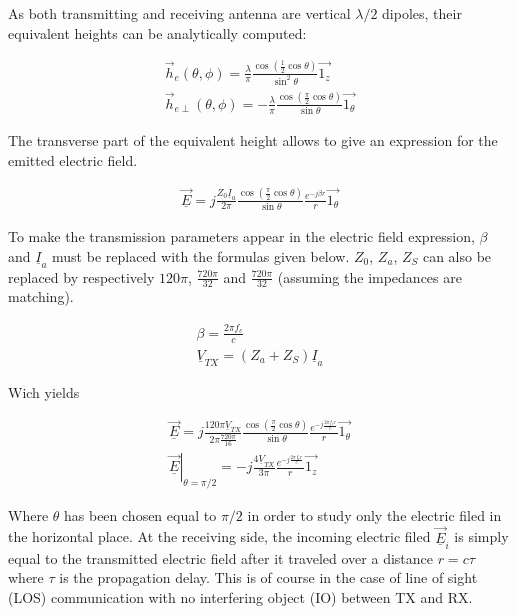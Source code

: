 \documentclass[10pt,a4paper]{ULBreport}
\begin{document}
As both transmitting and receiving antenna are vertical $\lambda/2$ dipoles, their equivalent heights can be analytically computed:

\begin{align*}
    \vec{h}_e (\theta, \phi) = \frac{\lambda}{\pi} \frac{\cos(\frac{1}{2}\cos \theta)}{\sin ^2 \theta}\vec{1_z}\\
    \vec{h}_{e\perp} (\theta, \phi) = -\frac{\lambda}{\pi} \frac{\cos(\frac{\pi}{2}\cos \theta)}{\sin \theta}\vec{1_\theta}
\end{align*}

The transverse part of the equivalent height allows to give an expression for the emitted electric field.

\begin{align*}
    \underline{\vec{E}} = j\frac{Z_0\underline{I}_a}{2\pi}\frac{\cos(\frac{\pi}{2}\cos \theta)}{\sin \theta}\frac{e^{-j\beta r}}{r}\vec{1_\theta}
\end{align*}

To make the transmission parameters appear in the electric field expression, $\beta$ and $\underline{I}_a$ must be replaced with the formulas given below. $Z_0$, $Z_a$, $Z_S$ can also be replaced by respectively $120\pi$, $\frac{720\pi}{32}$ and $\frac{720\pi}{32}$ (assuming the impedances are matching).

\begin{align*}
    \beta = \frac{2\pi f_c}{c}\\
    \underline{V}_{TX} = (Z_a + Z_S) \underline{I}_a
\end{align*}

Wich yields

\begin{align*}
    \underline{\vec{E}} = j\frac{120\pi\underline{V}_{TX}}{2\pi \frac{720\pi}{16}}\frac{\cos(\frac{\pi}{2}\cos \theta)}{\sin \theta}\frac{e^{-j \frac{2\pi f_c r}{c}}}{r}\vec{1_\theta}\\
    \left . \underline{\vec{E}}\right\vert_{\theta = \pi/2} = -j\frac{4\underline{V}_{TX}}{3\pi}\frac{e^{-j \frac{2\pi f_c r}{c}}}{r}\vec{1_z}
\end{align*}

Where $\theta$ has been chosen equal to $\pi /2$ in order to study only the electric filed in the horizontal place. At the receiving side, the incoming electric filed $\underline{\vec{E}}_i$ is simply equal to the transmitted electric field after it traveled over a distance $r = c\tau$ where $\tau$ is the propagation delay. This is of course in the case of line of sight (LOS) communication with no interfering object (IO) between TX and RX.
\end{document}

